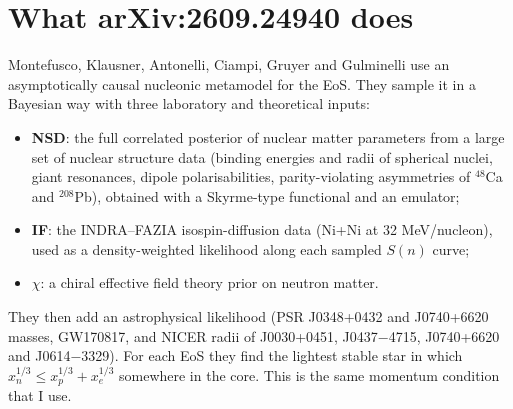 \documentclass[11pt,a4paper]{article}
\begin{document}
\section{What arXiv:2609.24940 does}
Montefusco, Klausner, Antonelli, Ciampi, Gruyer and Gulminelli \cite{Montefusco2026} use an asymptotically causal nucleonic metamodel for the EoS. They sample it in a Bayesian way with three laboratory and theoretical inputs:
\begin{itemize}
\item \textbf{NSD}: the full correlated posterior of nuclear matter parameters from a large set of nuclear structure data (binding energies and radii of spherical nuclei, giant resonances, dipole polarisabilities, parity-violating asymmetries of $^{48}$Ca and $^{208}$Pb), obtained with a Skyrme-type functional and an emulator;
\item \textbf{IF}: the INDRA--FAZIA isospin-diffusion data (Ni+Ni at 32 MeV/nucleon), used as a density-weighted likelihood along each sampled $S(n)$ curve;
\item \textbf{$\chi$}: a chiral effective field theory prior on neutron matter.
\end{itemize}
They then add an astrophysical likelihood (PSR J0348+0432 and J0740+6620 masses, GW170817, and NICER radii of J0030+0451, J0437$-$4715, J0740+6620 and J0614$-$3329). For each EoS they find the lightest stable star in which $x_n^{1/3}\le x_p^{1/3}+x_e^{1/3}$ somewhere in the core. This is the same momentum condition that I use.

\end{document}
